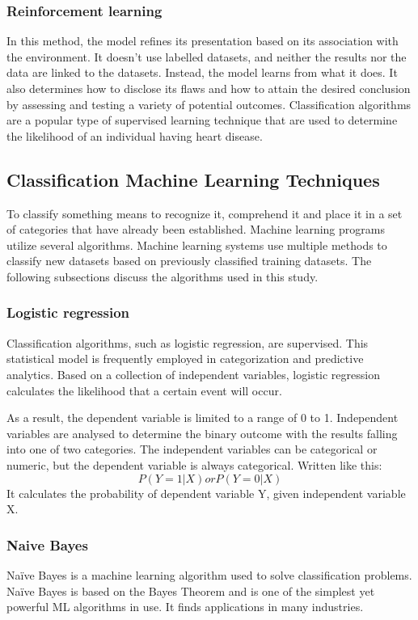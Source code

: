 \subsubsection{Reinforcement learning}
In this method, the model refines its presentation based on its association with the environment. It doesn't use labelled datasets, and neither the results nor the data are linked to the datasets. Instead, the model learns from what it does. It also determines how to disclose its flaws and how to attain the desired conclusion by assessing and testing a variety of potential outcomes.
Classification algorithms are a popular type of supervised learning technique that are used to determine the likelihood of an individual having heart disease.


\subsection{Classification Machine Learning Techniques}
To classify something means to recognize it, comprehend it and place it in a set of categories that have already been established. Machine learning programs utilize several algorithms. Machine learning systems use multiple methods to classify new datasets based on previously classified training datasets. The following subsections discuss the algorithms used in this study.

\subsubsection{Logistic regression}
Classification algorithms, such as logistic regression, are supervised.
This statistical model is frequently employed in categorization and predictive analytics. Based on a collection of independent variables, logistic regression calculates the likelihood that a certain event will occur. 

As a result, the dependent variable is limited to a range of 0 to 1. 
Independent variables are analysed to determine the binary outcome with the results falling into one of two categories. The independent variables can be categorical or numeric, but the dependent variable is always categorical. Written like this: $$P(Y=1|X) or P(Y=0|X)$$
It calculates the probability of dependent variable Y, given independent variable X. 


\subsubsection{Naive Bayes}
Naïve Bayes  is a machine learning algorithm used to solve classification problems. Naïve Bayes is based on the Bayes Theorem and is one of the simplest yet powerful ML algorithms in use. It finds applications in many industries.

